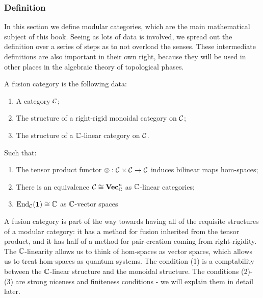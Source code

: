 \subsubsection{Definition}

In this section we define modular categories, which are the main mathematical subject of this book. Seeing as lots of data is involved, we spread out the definition over a series of steps as to not overload the senses. These intermediate definitions are also important in their own right, because they will be used in other places in the algebraic theory of topological phases.


\begin{defn} A fusion category is the following data:

\begin{enumerate}
\item A category ${\mathcal C}$;
\item The structure of a right-rigid monoidal category on ${\mathcal C}$;
\item The structure of a ${\mathbb C}$-linear category on ${\mathcal C}$.
\end{enumerate}

Such that:

\begin{enumerate}
\item The tensor product functor $\otimes: {\mathcal C}\times {\mathcal C}\to {\mathcal C}$ induces bilinear maps hom-spaces;
\item There is an equivalence ${\mathcal C} \cong {\bf Vec}_{\mathbb C}^n$ as ${\mathbb C}$-linear categories;
\item $\operatorname{End}_{\mathcal C}({\mathbf 1})\cong {\mathbb C}$ as ${\mathbb C}$-vector spaces
\end{enumerate}


\end{defn}

A fusion category is part of the way towards having all of the requisite structures of a modular category: it has a method for fusion inherited from the tensor product, and it has half of a method for pair-creation coming from right-rigidity. The ${\mathbb C}$-linearity allows us to think of hom-spaces as vector spaces, which allows us to treat hom-spaces as quantum systems. The condition (1) is a comptability between the ${\mathbb C}$-linear structure and the monoidal structure. The conditions (2)-(3) are strong niceness and finiteness conditions - we will explain them in detail later.

